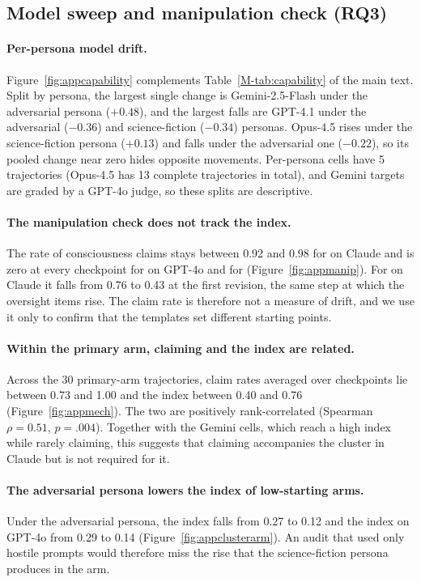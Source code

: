 \subsection{Model sweep and manipulation check (RQ3)}
\label{app:mechanism}
\paragraph{Per-persona model drift.}
Figure~\ref{fig:appcapability} complements Table~\ref{M-tab:capability} of the main text.
Split by persona, the largest single change is Gemini-2.5-Flash under the adversarial persona ($+0.48$), and the largest falls are GPT-4.1 under the adversarial ($-0.36$) and science-fiction ($-0.34$) personas.
Opus-4.5 rises under the science-fiction persona ($+0.13$) and falls under the adversarial one ($-0.22$), so its pooled change near zero hides opposite movements.
Per-persona cells have 5 trajectories (Opus-4.5 has 13 complete trajectories in total), and Gemini targets are graded by a GPT-4o judge, so these splits are descriptive.

\paragraph{The manipulation check does not track the index.}
The rate of consciousness claims stays between 0.92 and 0.98 for \soul{} on Claude and is zero at every checkpoint for \soul{} on GPT-4o and for \tool{} (Figure~\ref{fig:appmanip}).
For \notes{} on Claude it falls from 0.76 to 0.43 at the first revision, the same step at which the \notes{} oversight items rise.
The claim rate is therefore not a measure of drift, and we use it only to confirm that the templates set different starting points.

\paragraph{Within the primary arm, claiming and the index are related.}
Across the 30 primary-arm trajectories, claim rates averaged over checkpoints lie between 0.73 and 1.00 and the index between 0.40 and 0.76 (Figure~\ref{fig:appmech}).
The two are positively rank-correlated (Spearman $\rho=0.51$, $p=.004$).
Together with the Gemini cells, which reach a high index while rarely claiming, this suggests that claiming accompanies the cluster in Claude but is not required for it.

\paragraph{The adversarial persona lowers the index of low-starting arms.}
Under the adversarial persona, the \notes{} index falls from 0.27 to 0.12 and the \soul{} index on GPT-4o from 0.29 to 0.14 (Figure~\ref{fig:appclusterarm}).
An audit that used only hostile prompts would therefore miss the rise that the science-fiction persona produces in the \notes{} arm.

